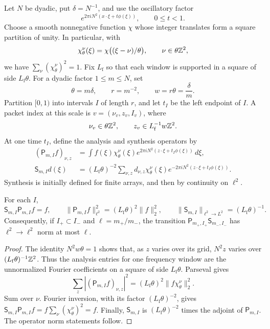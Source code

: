 Let $N$ be dyadic, put $\delta=N^{-1}$, and use the oscillatory factor
\[
 e^{2\pi iN^2(x\cdot\xi+t\phi(\xi))},\qquad 0\le t<1.
\]
Choose a smooth nonnegative function $\chi$ whose integer translates
form a square partition of unity.  In particular, with
\[
 \chi_\theta^\nu(\xi)=\chi\bigl((\xi-\nu)/\theta\bigr),
 \qquad \nu\in\theta\mathbb Z^2,
\]
we have $\sum_\nu(\chi_\theta^\nu)^2=1$.  Fix $L_{\mathrm f}$ so that
each window is supported in a square of side $L_{\mathrm f}\theta$.
For a dyadic factor $1\le m\le N$, set
\begin{equation}\label{pkt:scales}
 \theta=m\delta,\qquad r=m^{-2},\qquad
 w=r\theta=\frac{\delta}{m}.
\end{equation}
Partition $[0,1)$ into intervals $I$ of length $r$, and let $t_I$ be the
left endpoint of $I$.  A packet index at this scale is
$v=(\nu_v,z_v,I_v)$, where
\[
 \nu_v\in\theta\mathbb Z^2,
 \qquad z_v\in L_{\mathrm f}^{-1}w\mathbb Z^2.
\]
At one time $t_I$, define the analysis and synthesis operators by
\begin{align}
 (\mathsf P_{m,I}f)_{\nu,z}
 &=\int f(\xi)\chi_\theta^\nu(\xi)
       e^{2\pi iN^2(z\cdot\xi+t_I\phi(\xi))}\,d\xi,
       \label{pkt:analysis}\\
 \mathsf S_{m,I}d(\xi)
 &=(L_{\mathrm f}\theta)^{-2}
    \sum_{\nu,z}d_{\nu,z}\chi_\theta^\nu(\xi)
       e^{-2\pi iN^2(z\cdot\xi+t_I\phi(\xi))}.
       \label{pkt:synthesis}
\end{align}
Synthesis is initially defined for finite arrays, and then by continuity
on $\ell^2$.

\begin{lemma}\label{pkt:frame}
For each $I$,
\[
 \mathsf S_{m,I}\mathsf P_{m,I}f=f,
 \qquad
 \|\mathsf P_{m,I}f\|_{\ell^2}^2
   =(L_{\mathrm f}\theta)^2\|f\|_2^2,
 \qquad
 \|\mathsf S_{m,I}\|_{\ell^2\to L^2}
   =(L_{\mathrm f}\theta)^{-1}.
\]
Consequently, if $I_+\subset I_-$ and
$\ell=m_+/m_-$, the transition
$\mathsf P_{m_+,I_+}\mathsf S_{m_-,I_-}$ has
$\ell^2\to\ell^2$ norm at most $\ell$.
\end{lemma}

\begin{proof}
The identity $N^2w\theta=1$ shows that, as $z$ varies over its grid,
$N^2z$ varies over $(L_{\mathrm f}\theta)^{-1}\mathbb Z^2$.  Thus the analysis
entries for one frequency window are the unnormalized Fourier
coefficients on a square of side $L_{\mathrm f}\theta$.  Parseval gives
\[
 \sum_z|(\mathsf P_{m,I}f)_{\nu,z}|^2
  =(L_{\mathrm f}\theta)^2\|f\chi_\theta^\nu\|_2^2.
\]
Sum over $\nu$.  Fourier inversion, with its factor
$(L_{\mathrm f}\theta)^{-2}$, gives
$\mathsf S_{m,I}\mathsf P_{m,I}f
=f\sum_\nu(\chi_\theta^\nu)^2=f$.
Finally, $\mathsf S_{m,I}$ is
$(L_{\mathrm f}\theta)^{-2}$ times the adjoint of
$\mathsf P_{m,I}$.  The operator norm statements follow.
\end{proof}

